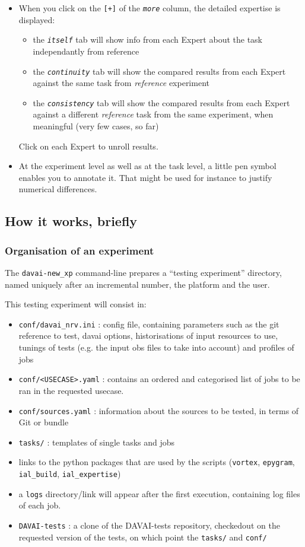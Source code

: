 \documentclass[a4paper,10pt,twoside]{article}
\begin{document}
\begin{itemize}
 \item When you click on the \texttt{[+]} of the \textit{\texttt{more}} column, the detailed expertise is displayed:
 \begin{itemize}
  \item the \textit{\texttt{itself}} tab will show info from each Expert about the task independantly from reference
  \item the \textit{\texttt{continuity}} tab will show the compared results from each Expert against the same task from \textit{reference} experiment
  \item the \textit{\texttt{consistency}} tab will show the compared results from each Expert against a different \textit{reference} task from the same experiment, when meaningful (very few cases, so far)
 \end{itemize}
 Click on each Expert to unroll results.
 \item At the experiment level as well as at the task level, a little pen symbol enables you to annotate it. That might be used for instance to justify numerical differences.
\end{itemize}





\newpage
\subsection{How it works, briefly}
\subsubsection{Organisation of an experiment}
The \texttt{davai-new\_xp} command-line prepares a ``testing experiment'' directory, named uniquely after an incremental number, the platform and the user.

\noindent This testing experiment will consist in:
\begin{itemize}
 \item \texttt{conf/davai\_nrv.ini} : config file, containing parameters such as the git reference to test, davai options, historisations of input resources to use, tunings of tests (e.g. the input obs files to take into account) and profiles of jobs
 \item \texttt{conf/<USECASE>.yaml} : contains an ordered and categorised list of jobs to be ran in the requested usecase.
 \item \texttt{conf/sources.yaml} : information about the sources to be tested, in terms of Git or bundle
 \item \texttt{tasks/} : templates of single tasks and jobs
 \item links to the python packages that are used by the scripts (\texttt{vortex}, \texttt{epygram}, \texttt{ial\_build}, \texttt{ial\_expertise})
 \item a \texttt{logs} directory/link will appear after the first execution, containing log files of each job.
 \item \texttt{DAVAI-tests} : a clone of the DAVAI-tests repository, checkedout on the requested version of the tests, on which point the \texttt{tasks/} and \texttt{conf/}
\end{itemize}
\end{document}
